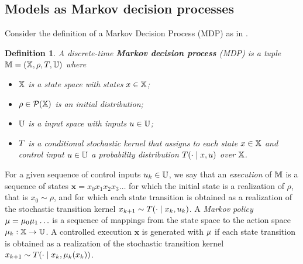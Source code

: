 \documentclass[conference]{IEEEtran}
\renewcommand{\cite}[1]{\citep{#1}}
\newtheorem{definition}{Definition}
\newcommand{\sofieNew}[1]{{\color{blue}#1}}
\begin{document}
\subsection{Models as Markov decision processes }
Consider the definition of a Markov Decision Process (MDP) as in \cite{Bertsekas1978}.
\begin{definition}
\label{def:MDP}
  A discrete-time \textbf{Markov decision process} (MDP) is a tuple $\mathbb{M} = (\mathbb{X}, \rho, T, \mathbb{U})$ where
  \begin{itemize}
    \item $\mathbb{X}$ is a state space with states $x\in\mathbb{X}$; %
    \item $\rho \in \mathcal P (\mathbb{X})$ is an initial distribution;
    \item $\mathbb{U}$ is a input space with inputs $u\in\mathbb{U}$;
    \item $T$ is a conditional stochastic kernel that assigns to each state $x\in \mathbb{X}$ and control input $u\in \mathbb{U}$ a probability distribution $T(\cdot\mid x,u)$ over $\mathbb{X}$.
  \end{itemize}
\end{definition}
\sofieNew{For a given sequence of control inputs $u_k \in \mathbb{U}$, we 
 say that an \emph{execution} of $\mathbb{M}$ is a sequence of states $\mathbf x = x_0x_1x_2x_3\ldots $ %
 for which the initial state is a realization of $\rho$, that is $x_0 \sim \rho$, and for which each state transition is obtained as a realization of the stochastic transition kernel $x_{k+1} \sim T(\cdot \mid x_k, u_k)$. 
A \emph{Markov policy} $\mu = \mu_0 \mu_1 \ldots$ is a sequence of mappings from the state space to the action space $\mu_k:\mathbb{X}\rightarrow \mathbb{U}$.  %
A controlled execution $\mathbf x$ is generated with $\mu$ if each state transition is obtained as a realization of the stochastic transition kernel $x_{k+1} \sim T(\cdot \mid x_k, \mu_k(x_k))$.}
\end{document}
